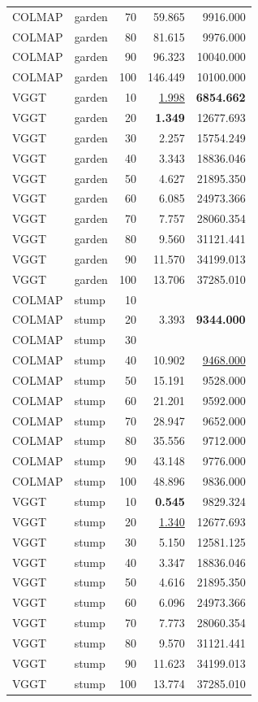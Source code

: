 \begin{table}[H]
\begin{tabular}{llrrr}
COLMAP & garden & 70 & 59.865 & 9916.000 \\
COLMAP & garden & 80 & 81.615 & 9976.000 \\
COLMAP & garden & 90 & 96.323 & 10040.000 \\
COLMAP & garden & 100 & 146.449 & 10100.000 \\
VGGT & garden & 10 & \underline{1.998} & \textbf{6854.662} \\
VGGT & garden & 20 & \textbf{1.349} & 12677.693 \\
VGGT & garden & 30 & 2.257 & 15754.249 \\
VGGT & garden & 40 & 3.343 & 18836.046 \\
VGGT & garden & 50 & 4.627 & 21895.350 \\
VGGT & garden & 60 & 6.085 & 24973.366 \\
VGGT & garden & 70 & 7.757 & 28060.354 \\
VGGT & garden & 80 & 9.560 & 31121.441 \\
VGGT & garden & 90 & 11.570 & 34199.013 \\
VGGT & garden & 100 & 13.706 & 37285.010 \\
\midrule
COLMAP & stump & 10 &  &  \\
COLMAP & stump & 20 & 3.393 & \textbf{9344.000} \\
COLMAP & stump & 30 &  &  \\
COLMAP & stump & 40 & 10.902 & \underline{9468.000} \\
COLMAP & stump & 50 & 15.191 & 9528.000 \\
COLMAP & stump & 60 & 21.201 & 9592.000 \\
COLMAP & stump & 70 & 28.947 & 9652.000 \\
COLMAP & stump & 80 & 35.556 & 9712.000 \\
COLMAP & stump & 90 & 43.148 & 9776.000 \\
COLMAP & stump & 100 & 48.896 & 9836.000 \\
VGGT & stump & 10 & \textbf{0.545} & 9829.324 \\
VGGT & stump & 20 & \underline{1.340} & 12677.693 \\
VGGT & stump & 30 & 5.150 & 12581.125 \\
VGGT & stump & 40 & 3.347 & 18836.046 \\
VGGT & stump & 50 & 4.616 & 21895.350 \\
VGGT & stump & 60 & 6.096 & 24973.366 \\
VGGT & stump & 70 & 7.773 & 28060.354 \\
VGGT & stump & 80 & 9.570 & 31121.441 \\
VGGT & stump & 90 & 11.623 & 34199.013 \\
VGGT & stump & 100 & 13.774 & 37285.010 \\
\bottomrule
\end{tabular}
\end{table}